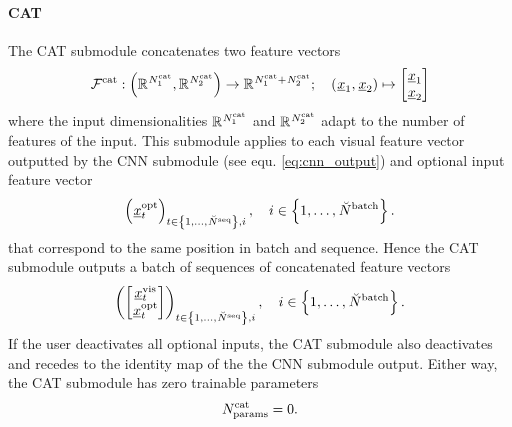 \paragraph*{CAT} ${}$\\
The CAT submodule concatenates
two feature vectors
\begin{align} \label{eq:cat}
    \CATMap
    :
    \tuple{\setOfAllRealNumbers^{\CATInp{1}}, \setOfAllRealNumbers^{\CATInp{2}}}
    \rightarrow 
    \setOfAllRealNumbers^{\CATInp{1} + \CATInp{2}}
    ;\quad
    \tuple{\featvec[]{}{1}{}{}, \featvec[]{}{2}{}{}}
    \mapsto
    \begin{bmatrix}
        \featvec[]{}{1}{}{} \\ \featvec[]{}{2}{}{}
    \end{bmatrix}
\end{align}
where the input dimensionalities
$\mathbb{R}^{\num[]{\cat}{1}{}{}}$
and
$\mathbb{R}^{\num[]{\cat}{2}{}{}}$
adapt to the number of features of the input.
This submodule applies to each
visual feature vector 
outputted by the CNN submodule 
(see equ. \ref{eq:cnn_output})
and optional input feature vector
\begin{equation} \label{eq:batch_opt}
    \series{\optFeatVec{t}}_{t \in \setOfInts{1, \dots, \seqLen}, i}
    ,\quad 
    i \in \setOfInts{1, \dots, \batchSize}.
\end{equation}
that correspond to the same position in batch and sequence.
Hence the CAT submodule outputs a batch of sequences
of concatenated feature vectors
\begin{equation} \label{eq:cat_output}
    \series{
        \begin{bmatrix} 
            \visFeatVec{t} \\ \optFeatVec{t}
        \end{bmatrix}
    }_{t \in \setOfInts{1, \dots, \seqLen}, i}
    ,\quad 
    i \in \setOfInts{1, \dots, \batchSize}.
\end{equation}
If the user deactivates all optional inputs,
the CAT submodule also deactivates and recedes to 
the identity map of the the CNN submodule output.
Either way, the CAT submodule has zero trainable parameters
\begin{equation}
    \CATNumP = 0.
\end{equation}




\newcommand{\GRULayerMap}[1]{\Func[]{\gru}{#1}{}{}}
\newcommand{\GRUNumLayer}{\num[\user]{\gru}{\layer}{}{}}
\newcommand{\GRUInp}[1]{\num[]{\gru}{\inp,#1}{}{}}
\newcommand{\GRUHiddenSize}{\num[\user]{\gru}{\hidden}{}{}}
\newcommand{\setOfRealNumbers}[1]{\left[#1\right]}
\newcommand{\GRUMap}{\Func[]{\gru}{}{}{}}
\newcommand{\GRUDropout}{\underline\delta}
\newcommand{\GRUDropoutP}{\prob[\user]{\gru}{}{}{}}
\newcommand{\GRUNumP}{\num[]{\gru}{\params}{}{}}

